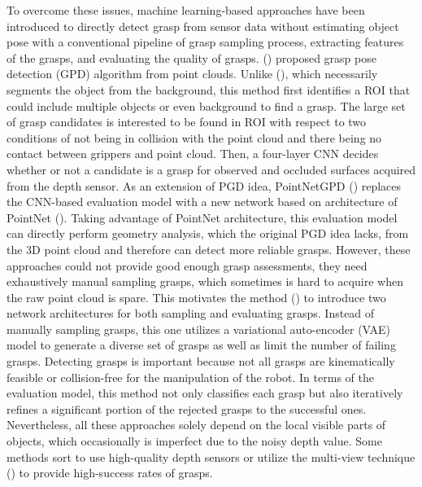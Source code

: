 To overcome these issues, machine learning-based approaches have been introduced to directly detect grasp from sensor data without estimating object pose with a conventional pipeline of grasp sampling process, extracting features of the grasps, and evaluating the quality of grasps. (\textcolor{cyan}{\cite{ten2017grasp}}) proposed grasp pose detection (GPD) algorithm from point clouds. Unlike (\textcolor{cyan}{\cite{herzog2012template}}), which necessarily segments the object from the background, this method first identifies a ROI that could include multiple objects or even background to find a grasp. The large set of grasp candidates is interested to be found in ROI with respect to two conditions of not being in collision with the point cloud and there being no contact between grippers and point cloud. Then, a four-layer CNN decides whether or not a candidate is a grasp for observed and occluded surfaces acquired from the depth sensor. As an extension of PGD idea, PointNetGPD (\textcolor{cyan}{\cite{liang2019pointnetgpd}}) replaces the CNN-based evaluation model with a new network based on architecture of PointNet (\textcolor{cyan}{\cite{qi2017pointnet}}). Taking advantage of PointNet architecture, this evaluation model can directly perform geometry analysis, which the original PGD idea lacks, from the 3D point cloud and therefore can detect more reliable grasps. However, these approaches could not provide good enough grasp assessments, they need exhaustively manual sampling grasps, which sometimes is hard to acquire when the raw point cloud is spare. This motivates the method (\textcolor{cyan}{\cite{mousavian20196}}) to introduce two network architectures for both sampling and evaluating grasps. Instead of manually sampling grasps, this one utilizes a variational auto-encoder (VAE) model to generate a diverse set of grasps as well as limit the number of failing grasps. Detecting grasps is important because not all grasps are kinematically feasible or collision-free for the manipulation of the robot. In terms of the evaluation model, this method not only classifies each grasp but also iteratively refines a significant portion of the rejected grasps to the successful ones. Nevertheless, all these approaches solely depend on the local visible parts of objects, which occasionally is imperfect due to the noisy depth value. Some methods sort to use high-quality depth sensors or utilize the multi-view technique (\textcolor{cyan}{\cite{ten2017grasp}}) to provide high-success rates of grasps.


